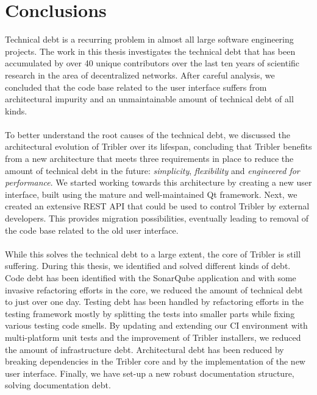 \chapter{Conclusions}
\label{chapter:conclusions}

Technical debt is a recurring problem in almost all large software engineering projects. The work in this thesis investigates the technical debt that has been accumulated by over 40 unique contributors over the last ten years of scientific research in the area of decentralized networks. After careful analysis, we concluded that the code base related to the user interface suffers from architectural impurity and an unmaintainable amount of technical debt of all kinds.\\\\
To better understand the root causes of the technical debt, we discussed the architectural evolution of Tribler over its lifespan, concluding that Tribler benefits from a new architecture that meets three requirements in place to reduce the amount of technical debt in the future: \emph{simplicity}, \emph{flexibility} and \emph{engineered for performance}. We started working towards this architecture by creating a new user interface, built using the mature and well-maintained Qt framework. Next, we created an extensive REST API that could be used to control Tribler by external developers. This provides migration possibilities, eventually leading to removal of the code base related to the old user interface.\\\\
While this solves the technical debt to a large extent, the core of Tribler is still suffering. During this thesis, we identified and solved different kinds of debt. Code debt has been identified with the SonarQube application and with some invasive refactoring efforts in the core, we reduced the amount of technical debt to just over one day. Testing debt has been handled by refactoring efforts in the testing framework mostly by splitting the tests into smaller parts while fixing various testing code smells. By updating and extending our CI environment with multi-platform unit tests and the improvement of Tribler installers, we reduced the amount of infrastructure debt. Architectural debt has been reduced by breaking dependencies in the Tribler core and by the implementation of the new user interface. Finally, we have set-up a new robust documentation structure, solving documentation debt.\\\\

